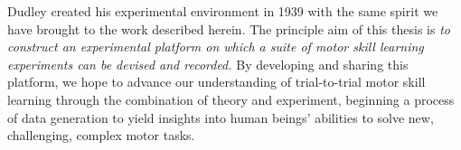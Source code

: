 \documentclass[../main.tex]{subfiles}
\begin{document}
Dudley created his experimental environment in 1939 with the same spirit we have brought to the work described herein. The principle aim of this thesis is \textit{to construct an experimental platform on which a suite of motor skill learning experiments can be devised and recorded.} By developing and sharing this platform, we hope to advance our understanding of trial-to-trial motor skill learning through the combination of theory and experiment, beginning a process of data generation to yield insights into human beings' abilities to solve new, challenging, complex motor tasks.




\end{document}
